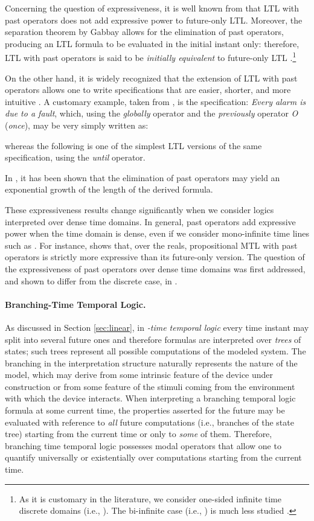 Concerning the question of expressiveness, it is well known from 
\cite{GPSS80} that LTL with past operators does not add expressive 
power to future-only LTL. Moreover, the separation theorem by 
Gabbay \cite{Gab87} allows for the elimination of past operators, 
producing an LTL formula to be evaluated in the initial instant 
only: therefore, LTL with past operators is said to be \emph{initially equivalent}
to future-only LTL \cite{Eme90}.\footnote{As it is customary in the literature, we consider one-sided infinite time discrete domains (i.e., ). The bi-infinite case (i.e., ) is much less studied \cite{PP04}.}

On the other hand, it is widely recognized that the extension 
of LTL with past operators \cite{Kam68} allows one to write specifications 
that are easier, shorter, and more intuitive \cite{LPZ85}. A customary 
example, taken from \cite{Sch02}, is the specification: \emph{Every alarm is due to a fault},
which, using the \emph{globally} operator  and the \emph{previously} operator \emph{O}
(\emph{once}), may be very simply written as: 

whereas the following is one of the simplest LTL versions of 
the same specification, using the \emph{until} operator. 


In \cite{LMS02}, it has been shown that the elimination of past operators 
may yield an exponential growth of the length of the derived 
formula.

These expressiveness results change significantly when we consider 
logics interpreted over dense time domains. In general, past 
operators add expressive power when the time domain is dense, 
even if we consider mono-infinite time lines such as . For instance, 
\cite{BCM05} shows that, over the reals, propositional MTL with past 
operators is strictly more expressive than its future-only version. 
The question of the expressiveness of past operators over dense 
time domains was first addressed, and shown to differ from the 
discrete case, in \cite{AH92b,AH93}.


\paragraph{Branching-Time Temporal Logic.}
As discussed in Section \ref{sec:linear}, in \emph{-time temporal logic} 
every time instant may split into several future ones and therefore 
formulas are interpreted over \emph{trees} of states; such trees 
represent all possible computations of the modeled system. The 
branching in the interpretation structure naturally represents 
the  nature of the model, which may derive from 
some intrinsic feature of the device under construction or from 
some feature of the stimuli coming from the environment with 
which the device interacts. When interpreting a branching temporal 
logic formula at some current time, the properties asserted for 
the future may be evaluated with reference to \emph{all} future 
computations (i.e., branches of the state tree) starting from 
the current time or only to \emph{some} of them. Therefore, branching 
time temporal logic possesses modal operators that allow one 
to quantify universally or existentially over computations starting 
from the current time.

